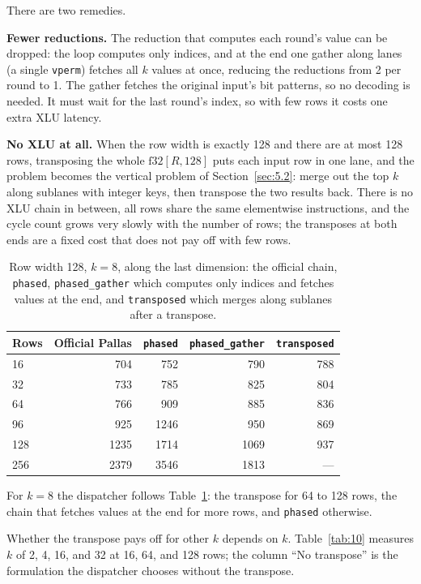 \documentclass[sigconf,nonacm,balance=false]{acmart}
\newcommand{\code}[1]{\texttt{#1}}
\begin{document}
There are two remedies.

\textbf{Fewer reductions.} The reduction that computes each round's value can be dropped: the loop computes only indices, and at the end one gather along lanes (a single \code{vperm}) fetches all $k$ values at once, reducing the reductions from 2 per round to 1. The gather fetches the original input's bit patterns, so no decoding is needed. It must wait for the last round's index, so with few rows it costs one extra XLU latency.

\textbf{No XLU at all.} When the row width is exactly 128 and there are at most 128 rows, transposing the whole $\mathrm{f32}[R,128]$ puts each input row in one lane, and the problem becomes the vertical problem of Section~\ref{sec:5.2}: merge out the top $k$ along sublanes with integer keys, then transpose the two results back. There is no XLU chain in between, all rows share the same elementwise instructions, and the cycle count grows very slowly with the number of rows; the transposes at both ends are a fixed cost that does not pay off with few rows.

\begin{table}
\centering
\caption{Row width 128, $k = 8$, along the last dimension: the official chain, \code{phased}, \code{phased\_\allowbreak{}gather} which computes only indices and fetches values at the end, and \code{transposed} which merges along sublanes after a transpose.}
\label{tab:9}
\begin{tabular}{lrrrr}
\toprule
Rows & Official Pallas & \code{phased} & \code{phased\_\allowbreak{}gather} & \code{transposed} \\
\midrule
16 & 704 & 752 & 790 & 788 \\
32 & 733 & 785 & 825 & 804 \\
64 & 766 & 909 & 885 & 836 \\
96 & 925 & 1246 & 950 & 869 \\
128 & 1235 & 1714 & 1069 & 937 \\
256 & 2379 & 3546 & 1813 & --- \\
\bottomrule
\end{tabular}
\end{table}

For $k = 8$ the dispatcher follows Table~\ref{tab:9}: the transpose for 64 to 128 rows, the chain that fetches values at the end for more rows, and \code{phased} otherwise.

Whether the transpose pays off for other $k$ depends on $k$. Table~\ref{tab:10} measures $k$ of 2, 4, 16, and 32 at 16, 64, and 128 rows; the column ``No transpose'' is the formulation the dispatcher chooses without the transpose.
\end{document}
